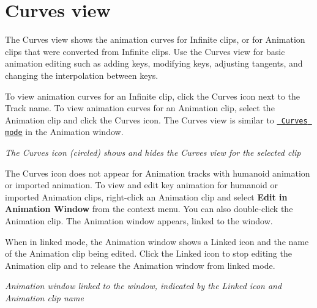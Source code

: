 \chapter{Curves view}
\hypertarget{md__library_2_package_cache_2com_8unity_8timeline_0d1_87_86_2_documentation_0i_2crv__about}{}\label{md__library_2_package_cache_2com_8unity_8timeline_0d1_87_86_2_documentation_0i_2crv__about}
\label{md__library_2_package_cache_2com_8unity_8timeline_0d1_87_86_2_documentation_0i_2crv__about_autotoc_md1134}%
%
 The Curves view shows the animation curves for Infinite clips, or for Animation clips that were converted from Infinite clips. Use the Curves view for basic animation editing such as adding keys, modifying keys, adjusting tangents, and changing the interpolation between keys.

To view animation curves for an Infinite clip, click the Curves icon next to the Track name. To view animation curves for an Animation clip, select the Animation clip and click the Curves icon. The Curves view is similar to \href{https://docs.unity3d.com/Manual/animeditor-AnimationCurves.html}{\texttt{ Curves mode}} in the Animation window.



{\itshape The Curves icon (circled) shows and hides the Curves view for the selected clip}

The Curves icon does not appear for Animation tracks with humanoid animation or imported animation. To view and edit key animation for humanoid or imported Animation clips, right-\/click an Animation clip and select {\bfseries{Edit in Animation Window}} from the context menu. You can also double-\/click the Animation clip. The Animation window appears, linked to the  window.

When in linked mode, the Animation window shows a Linked icon and the name of the Animation clip being edited. Click the Linked icon to stop editing the Animation clip and to release the Animation window from linked mode.



{\itshape Animation window linked to the  window, indicated by the Linked icon and Animation clip name} 